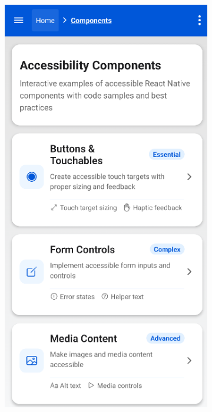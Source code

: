 \begin{figure}[ht]
    \centering
    \begin{subfigure}[b]{0.42\textwidth}
        \centering
        \includegraphics[width=\linewidth, alt={First part of the Components screen}]{img/components1.png}

\end{subfigure}
\end{figure}
